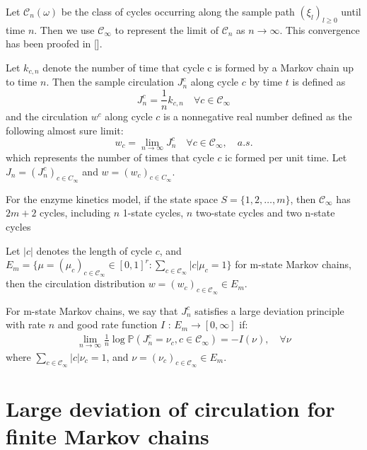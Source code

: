 \documentclass[11pt,en,cite=authoryear]{elegantpaper}
\begin{document}
\begin{definition}
    Let $\mathcal{C}_n(\omega)$ be the class of cycles occurring along the sample path $(\xi_l)_{l\ge 0}$ until time $n$. Then we use $\mathcal{C}_{\infty}$ to represent the limit of $\mathcal{C}_n$ as $n \rightarrow \infty$. This convergence has been proofed in [].
\end{definition}

\begin{definition} %
    Let $k_{c, n}$ denote the number of time that cycle c is formed by a Markov chain up to time $n$. Then the sample circulation $J_{n}^c$ along cycle $c$ by time $t$ is defined as
    $$
    J_{n}^c = \frac{1}{n} k_{c, n} \quad \forall c \in \mathcal{C}_{\infty}
    $$
    and the circulation $w^c$ along cycle $c$ is a nonnegative real number defined as the following almost sure limit:
    $$
    w_c = \lim_{n \rightarrow \infty} J_{n}^c \quad \forall c \in \mathcal{C}_{\infty}, \quad a.s.
    $$
    which represents the number of times that cycle $c$ ic formed per unit time. Let $J_n = (J_n^c)_{c \in C_{\infty}}$ and $w =  (w_c)_{c \in C_{\infty}}$.
\end{definition}

For the enzyme kinetics model, if the state space $S=\{1, 2, \dots, m\}$, then $\mathcal{C}_{\infty}$ has $2m+2$ cycles, including $n$ 1-state cycles, $n$ two-state cycles and two n-state cycles

Let $|c|$ denotes the length of cycle $c$, and 
$E_m = \{\mu=(\mu_c)_{c\in \mathcal{C}_{\infty}} \in [0, 1]^r :\sum_{c \in \mathcal{C}_{\infty}} |c| \mu_c  = 1\}$ for m-state Markov chains, then the circulation distribution $w = (w_{c})_{c \in \mathcal{C}_{\infty}} \in E_m$.

\begin{definition}
    For m-state Markov chains, we say that $J_{n}^c$ satisfies a large deviation principle with rate $n$ and good rate function $I$ : $E_m \rightarrow [0, \infty]$ if:
    \begin{align}
        \lim_{n \rightarrow \infty} \frac{1}{n} \log \mathbb{P}(J_{n}^c = \nu_c , c \in \mathcal{C}_{\infty}) = - I(\nu), \quad \forall \nu
    \end{align}
    where $\sum_{c \in \mathcal{C}_{\infty}} |c| \nu_c = 1$, 
    and $\nu = (\nu_c)_{c \in \mathcal{C}_{\infty}} \in E_m$.
\end{definition}


\section{Large deviation of circulation for finite Markov chains}
\end{document}
